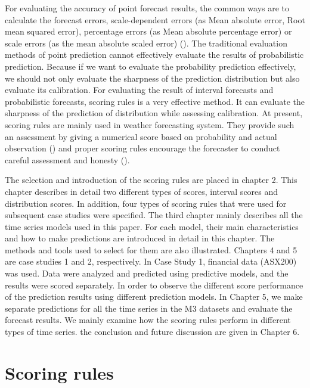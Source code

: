 \documentclass{monashthesis}
\theoremstyle{definition}
\theoremstyle{definition}
\theoremstyle{definition}
\theoremstyle{remark}
\begin{document}
For evaluating the accuracy of point forecast results, the common ways
are to calculate the forecast errors, scale-dependent errors (as Mean
absolute error, Root mean squared error), percentage errors (as Mean
absolute percentage error) or scale errors (as the mean absolute scaled
error) (\textcite{RA18}). The traditional evaluation methods of point
prediction cannot effectively evaluate the results of probabilistic
prediction. Because if we want to evaluate the probability prediction
effectively, we should not only evaluate the sharpness of the prediction
distribution but also evaluate its calibration. For evaluating the
result of interval forecasts and probabilistic forecasts, scoring rules
is a very effective method. It can evaluate the sharpness of the
prediction of distribution while assessing calibration. At present,
scoring rules are mainly used in weather forecasting system. They
provide such an assessment by giving a numerical score based on
probability and actual observation (\textcite{W96}) and proper scoring
rules encourage the forecaster to conduct careful assessment and honesty
(\textcite{GR07}).

The selection and introduction of the scoring rules are placed in
chapter 2. This chapter describes in detail two different types of
scores, interval scores and distribution scores. In addition, four types
of scoring rules that were used for subsequent case studies were
specified. The third chapter mainly describes all the time series models
used in this paper. For each model, their main characteristics and how
to make predictions are introduced in detail in this chapter. The
methods and tools used to select for them are also illustrated. Chapters
4 and 5 are case studies 1 and 2, respectively. In Case Study 1,
financial data (ASX200) was used. Data were analyzed and predicted using
predictive models, and the results were scored separately. In order to
observe the different score performance of the prediction results using
different prediction models. In Chapter 5, we make separate predictions
for all the time series in the M3 datasets and evaluate the forecast
results. We mainly examine how the scoring rules perform in different
types of time series. the conclusion and future discussion are given in
Chapter 6.

\chapter{Scoring rules}\label{scoring-rules}
\end{document}
